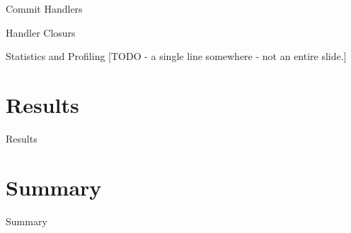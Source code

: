 \documentclass[]{beamer}
\begin{document}
\begin{frame}{Commit Handlers}
\end{frame}

\begin{frame}{Handler Closurs}
\end{frame}

\begin{frame}{Statistics and Profiling}
[TODO - a single line somewhere - not an entire slide.]
\end{frame}

\section{Results}

\begin{frame}{Results}
\end{frame}

\section{Summary}

\begin{frame}{Summary}
\end{frame}
\end{document}
